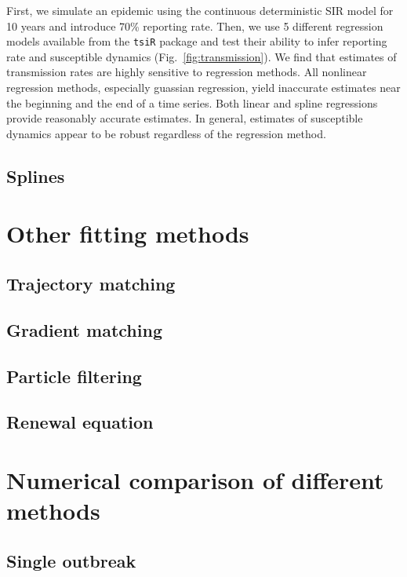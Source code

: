 \documentclass{article}
\newcommand{\fref}[1]{Fig.~\ref{fig:#1}}
\begin{document}
First, we simulate an epidemic using the continuous deterministic SIR model for 10 years and introduce 70\% reporting rate.
Then, we use 5 different regression models available from the \texttt{tsiR} package and test their ability to infer reporting rate and susceptible dynamics (\fref{transmission}).
We find that estimates of transmission rates are highly sensitive to regression methods.
All nonlinear regression methods, especially guassian regression, yield inaccurate estimates near the beginning and the end of a time series.
Both linear and spline regressions provide reasonably accurate estimates.
In general, estimates of susceptible dynamics appear to be robust regardless of the regression method.



\subsection{Splines}



\pagebreak

\section{Other fitting methods}

\subsection{Trajectory matching}

\subsection{Gradient matching}

\subsection{Particle filtering}

\subsection{Renewal equation}

\pagebreak

\section{Numerical comparison of different methods}

\subsection{Single outbreak}
\end{document}
